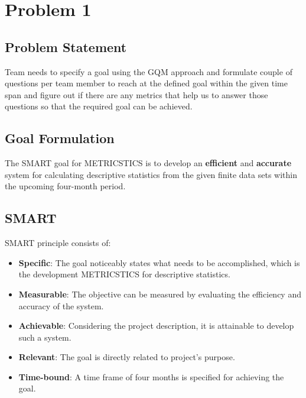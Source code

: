 \chapter{Problem 1}

\section{Problem Statement}

Team needs to specify a goal using the \ac{GQM} approach and formulate couple of questions per team member to reach at the defined goal within the given time span and figure out if there are any metrics that help us to answer those questions so that the required goal can be achieved.

\section{Goal Formulation}

The SMART goal for METRICSTICS is to develop an \textbf{efficient} and \textbf{accurate} system for \mbox{calculating} descriptive statistics from the given finite data sets within the upcoming four-month period.

\section{SMART}

SMART \cite{smart-principle} principle consists of:
\begin{itemize}
\item \textbf{Specific}: The goal noticeably states what needs to be accomplished, which is the development \mbox{METRICSTICS} for descriptive statistics.
\item \textbf{Measurable}: The objective can be measured by evaluating the efficiency and accuracy of the system.
\item \textbf{Achievable}: Considering the project description, it is attainable to develop such a system.
\item \textbf{Relevant}: The goal is directly related to project's  purpose.
\item \textbf{Time-bound}: A time frame of four months is specified for achieving the goal.
\end{itemize}

